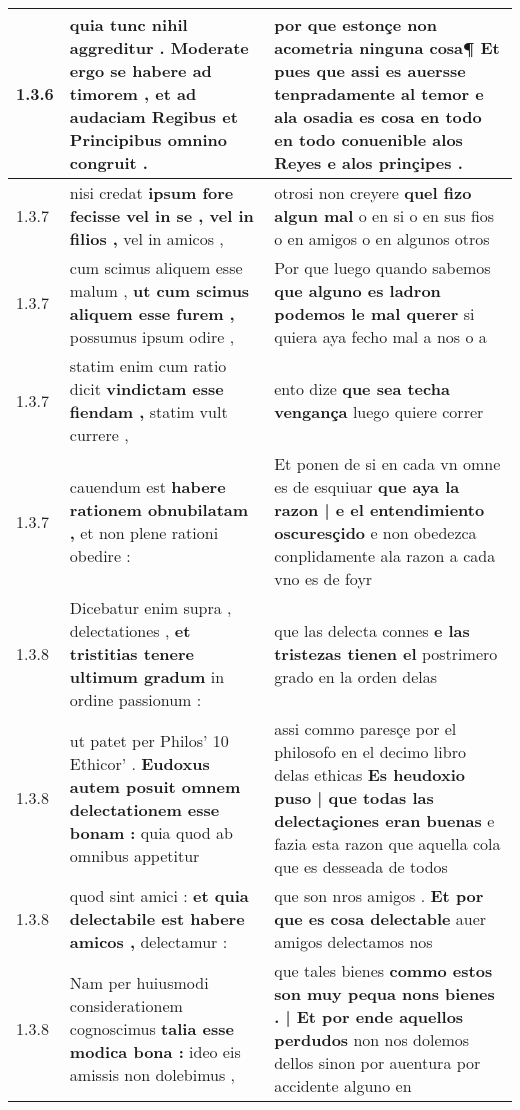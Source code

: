 \begin{tabular}{|p{1cm}|p{6.5cm}|p{6.5cm}|}
1.3.6 & quia tunc nihil aggreditur . \textbf{ Moderate ergo se habere ad timorem , } et ad audaciam Regibus et Principibus omnino congruit . & por que estonçe non acometria ninguna cosa¶ Et pues \textbf{ que assi es auersse tenpradamente al temor } e ala osadia es cosa en todo en todo conuenible alos Reyes e alos prinçipes . \\\hline
1.3.7 & nisi credat \textbf{ ipsum fore fecisse vel in se , vel in filios , } vel in amicos , & otrosi non creyere \textbf{ quel fizo algun mal } o en si o en sus fios o en amigos o en algunos otros \\\hline
1.3.7 & cum scimus aliquem esse malum , \textbf{ ut cum scimus aliquem esse furem , } possumus ipsum odire , & Por que luego quando sabemos \textbf{ que alguno es ladron podemos le mal querer } si quiera aya fecho mal a nos o a \\\hline
1.3.7 & statim enim cum ratio dicit \textbf{ vindictam esse fiendam , } statim vult currere , & ento dize \textbf{ que sea techa vengança } luego quiere correr \\\hline
1.3.7 & cauendum est \textbf{ habere rationem obnubilatam , } et non plene rationi obedire : & Et ponen de si en cada vn omne es de esquiuar \textbf{ que aya la razon | e el entendimiento oscuresçido } e non obedezca conplidamente ala razon a cada vno es de foyr \\\hline
1.3.8 & Dicebatur enim supra , delectationes , \textbf{ et tristitias tenere ultimum gradum } in ordine passionum : & que las delecta connes \textbf{ e las tristezas tienen el } postrimero grado en la orden delas \\\hline
1.3.8 & ut patet per Philos’ 10 Ethicor’ . \textbf{ Eudoxus autem posuit omnem delectationem esse bonam : } quia quod ab omnibus appetitur & assi commo paresçe por el philosofo en el decimo libro delas ethicas \textbf{ Es heudoxio puso | que todas las delectaçiones eran buenas } e fazia esta razon que aquella cola que es desseada de todos \\\hline
1.3.8 & quod sint amici : \textbf{ et quia delectabile est habere amicos , } delectamur : & que son nros amigos . \textbf{ Et por que es cosa delectable } auer amigos delectamos nos \\\hline
1.3.8 & Nam per huiusmodi considerationem cognoscimus \textbf{ talia esse modica bona : } ideo eis amissis non dolebimus , & que tales bienes \textbf{ commo estos son muy pequa nons bienes . | Et por ende aquellos perdudos } non nos dolemos dellos sinon por auentura por accidente alguno en \\\hline

\end{tabular}
